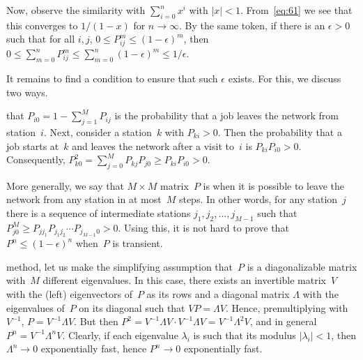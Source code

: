 \documentclass[stochastic-or.tex]{subfiles}
\begin{document}
Now, observe the similarity with $\sum_{i=0}^n x^i$ with $|x| < 1$.
From~\cref{eq:61} we see that this converges to $1/(1-x)$ for $n\to \infty$.
By the same token, if there is an $\epsilon>0$ such that for all $i, j$, $0\leq P^m_{ij} \leq (1-\epsilon)^m$, then $0\leq \sum_{m=0}^n P_{ij}^m \leq \sum_{m=0}^n (1-\epsilon)^m \leq 1/\epsilon$.

It remains to find a condition to ensure that such $\epsilon$ exists.  For this, we discuss two ways.

 that $P_{i0} = 1-\sum_{j=1}^M P_{ij}$ is the probability that a job leaves the network from station~$i$.
Next, consider a station~$k$ with $P_{ki} > 0$.
Then the probability that a job starts at~$k$ and leaves the network after a visit to~$i$ is  $P_{ki}P_{i0}>0$.
Consequently, $P^2_{k0} = \sum_{j=0}^M P_{kj}P_{j0} \geq P_{ki}P_{i0} > 0$.


More generally, we say that $M\times M$ matrix~$P$ is  when it is possible to leave the network from any station in at most~$M$ steps.
In other words, for any station~$j$ there is a sequence of intermediate stations $j_1, j_2, \ldots , j_{M-1}$ such that $P^{M}_{j0} \geq P_{j j_1}P_{j_1 j_2}\cdots P_{j_{M-1}0} > 0$.
Using this, it is not hard to prove that $P^n \leq  (1-\epsilon)^n$ when~$P$ is transient.

 method, let us make the simplifying assumption that~$P$ is a diagonalizable matrix with~$M$ different eigenvalues.
In this case, there exists an invertible matrix~$V$ with the (left) eigenvectors of~$P$ as its rows and a diagonal matrix $\Lambda$ with the eigenvalues of~$P$ on its diagonal such that $ V P = \Lambda V$.
Hence, premultiplying with $V^{-1}$, $ P = V^{-1}\Lambda V$.
But then $P^2 = V^{-1}\Lambda V \cdot V^{-1}\Lambda V= V^{-1}\Lambda^2 V$, and in general $P^n = V^{-1}\Lambda^n V$.
Clearly, if each eigenvalue $\lambda_i$ is such that its modulus $|\lambda_i| < 1$, then $\Lambda^n \to 0$ exponentially fast, hence $P^n\to 0$ exponentially fast.
\end{document}
